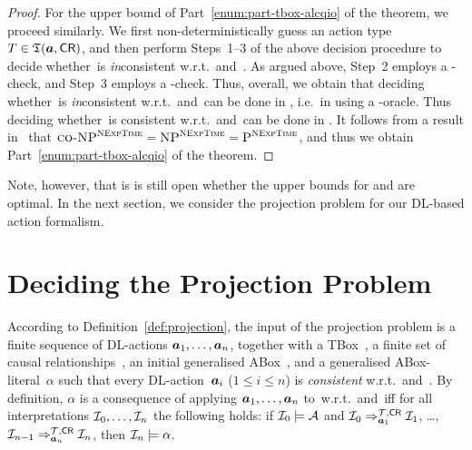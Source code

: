 \begin{proof}
    For the upper bound of Part~\ref{enum:part-tbox-alcqio} of the theorem, we
    proceed similarly.  We first non-deterministically guess an action type
    $T\in\mathfrak{T}(\boldsymbol a,\mathsf{CR})$, and then perform Steps~1--3 of the above decision
    procedure to decide whether~\abf is \emph{in}consistent w.r.t.~\Tmc and~\CR.
    As argued above, Step~2 employs a \NExpTime-check, and Step~3 employs a
    \coNExpTime-check.  Thus, overall, we obtain that deciding whether~\abf is
    \emph{in}consistent w.r.t.~\Tmc and~\CR can be done in \NPToNExpTime,
    i.e.~in \NP using a \NExpTime-oracle.  Thus deciding whether~\abf is
    consistent w.r.t.~\Tmc and~\CR can be done in \coNPToNExpTime.  It follows
    from a result in~\cite{Hem-STOC87} that
    $\coNPToNExpTime=\NPToNExpTime=\PTimeToNExpTime$, and thus we obtain
    Part~\ref{enum:part-tbox-alcqio} of the theorem.
\end{proof}

\noindent
Note, however, that is is still open whether the upper bounds for \ALCQI and
\ALCQIO are optimal.  In the next section, we consider the projection problem
for our DL-based action formalism.


\section{Deciding the Projection Problem}\label{sec:projection}

According to Definition~\ref{def:projection}, the input of the projection
problem is a finite sequence of DL-actions $\boldsymbol a_1,\dots,\boldsymbol a_n$, together with
a TBox~\Tmc, a finite set of causal relationships~\CR, an initial generalised
ABox~\Amc, and a generalised ABox-literal~$\alpha$ such that every
DL-action~$\boldsymbol a_i$ ($1\le i\le n$) is \emph{consistent} w.r.t.~\Tmc and~\CR.  By
definition, $\alpha$ is a consequence of applying $\boldsymbol a_1,\dots,\boldsymbol a_n$
to~\Amc w.r.t.~\Tmc and~\CR iff for all interpretations $\mathcal{I}_0,\dots,\mathcal{I}_n$
the following holds: if $\mathcal{I}_0\models\mathcal{A}$ and
$\mathcal{I}_0\Rightarrow_{\boldsymbol a_1}^{\mathcal{T},\mathsf{CR}}\mathcal{I}_1$, \dots,
$\mathcal{I}_{n-1}\Rightarrow_{\boldsymbol a_n}^{\mathcal{T},\mathsf{CR}}\mathcal{I}_n$, then $\mathcal{I}_n\models\alpha$.

